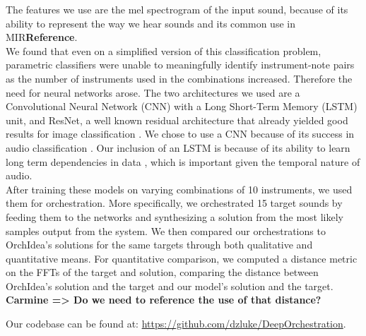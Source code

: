 \documentclass{article}
\newcommand{\carmine}[1]{\textbf{\color{red} Carmine => #1}}
\begin{document}

The features we use are the mel spectrogram of the input sound, because of its ability to represent the way we hear sounds and its common use in MIR\textbf{Reference}.\\

We found that even on a simplified version of this classification problem, parametric classifiers were unable to meaningfully identify instrument-note pairs as the number of instruments used in the combinations increased. Therefore the need for neural networks arose. The two architectures we used are a Convolutional Neural Network (CNN) with a Long Short-Term Memory (LSTM) unit, and ResNet, a well known residual architecture that already yielded good results for image classification \cite{He15}. We chose to use a CNN because of its success in audio classification \cite{Hershey16}. Our inclusion of an LSTM is because of its ability to learn long term dependencies in data \cite{Hochreiter97}, which is important given the temporal nature of audio.\\

After training these models on varying combinations of 10 instruments, we used them for orchestration. More specifically, we orchestrated 15 target sounds by feeding them to the networks and synthesizing a solution from the most likely samples output from the system. We then compared our orchestrations to OrchIdea's solutions for the same targets through both qualitative and quantitative means. For quantitative comparison, we computed a distance metric on the FFTs of the target and solution, comparing the distance between OrchIdea's solution and the target and our model's solution and the target. \carmine{Do we need to reference the use of that distance?}

Our codebase can be found at: \url{https://github.com/dzluke/DeepOrchestration}.
\end{document}
